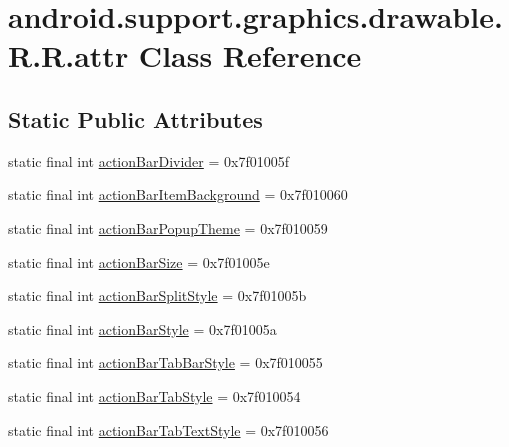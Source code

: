 \hypertarget{classandroid_1_1support_1_1graphics_1_1drawable_1_1_r_1_1attr}{
\section{android.support.graphics.drawable.R.R.attr Class Reference}
\label{classandroid_1_1support_1_1graphics_1_1drawable_1_1_r_1_1attr}
}
\subsection*{Static Public Attributes}
\begin{CompactItemize}
\item 
static final int \hyperlink{classandroid_1_1support_1_1graphics_1_1drawable_1_1_r_1_1attr_d4af8316e59298bb51889c07698401bf}{actionBarDivider} = 0x7f01005f
\item 
static final int \hyperlink{classandroid_1_1support_1_1graphics_1_1drawable_1_1_r_1_1attr_b3de99945c9ecfe4fbe0cc1c06d5f036}{actionBarItemBackground} = 0x7f010060
\item 
static final int \hyperlink{classandroid_1_1support_1_1graphics_1_1drawable_1_1_r_1_1attr_719190405a664f0753615599a594b92d}{actionBarPopupTheme} = 0x7f010059
\item 
static final int \hyperlink{classandroid_1_1support_1_1graphics_1_1drawable_1_1_r_1_1attr_0b7bad1a9da4d07dcba72d6820f113c0}{actionBarSize} = 0x7f01005e
\item 
static final int \hyperlink{classandroid_1_1support_1_1graphics_1_1drawable_1_1_r_1_1attr_ed3b4d26c95cc35a968ba4241bfef276}{actionBarSplitStyle} = 0x7f01005b
\item 
static final int \hyperlink{classandroid_1_1support_1_1graphics_1_1drawable_1_1_r_1_1attr_65417124703312b1993f018e5de40900}{actionBarStyle} = 0x7f01005a
\item 
static final int \hyperlink{classandroid_1_1support_1_1graphics_1_1drawable_1_1_r_1_1attr_1441c18bc36233b9aa4fa6867869d34e}{actionBarTabBarStyle} = 0x7f010055
\item 
static final int \hyperlink{classandroid_1_1support_1_1graphics_1_1drawable_1_1_r_1_1attr_7694e384d66dc7cef7b7047c3aff0595}{actionBarTabStyle} = 0x7f010054
\item 
static final int \hyperlink{classandroid_1_1support_1_1graphics_1_1drawable_1_1_r_1_1attr_004be8c001e4e882ef09e4e7679e2648}{actionBarTabTextStyle} = 0x7f010056
\item 

\end{CompactItemize}
